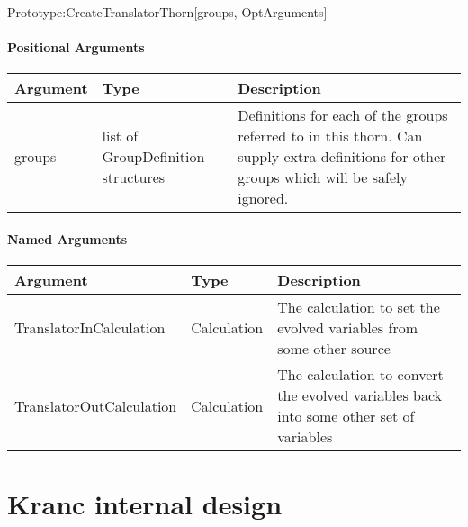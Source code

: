 \documentclass{report}
\newcommand{\tablewidth}{\textwidth}
\begin{document}
Prototype:CreateTranslatorThorn[groups, OptArguments]

\subsubsection{Positional Arguments}

\begin{center}
\begin{tabularx}{\tablewidth}{|l|l|X|}
  \hline
  \bf Argument & \bf Type & \bf Description \\
  \hline

  groups & list of GroupDefinition structures 

& Definitions for each of the groups referred to in this thorn. Can
  supply extra definitions for other groups which will be safely
  ignored. \\
  \hline
\end{tabularx}
\end{center}

\subsubsection{Named Arguments}

\begin{center}
\begin{tabularx}{\tablewidth}{|l|l|X|}
  \hline
  \bf Argument & \bf Type & \bf Description\\
  \hline
  TranslatorInCalculation & Calculation & The calculation to set the evolved 
                                          variables from some other source  \\
  TranslatorOutCalculation & Calculation & The calculation to convert the evolved
                                           variables back into some other set of 
                                           variables  \\
  \hline
\end{tabularx}
\end{center}





\chapter{Kranc internal design}
\end{document}
